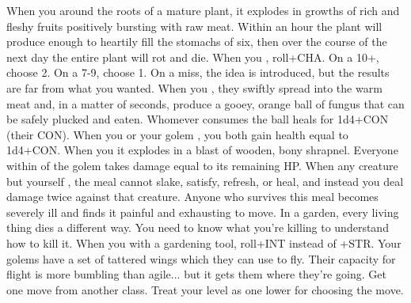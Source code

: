 \documentclass[darkmode]{dw_playbook}
\begin{document}
    {
            {When you  around the roots of a mature plant, it explodes in growths of rich and fleshy fruits positively bursting with raw meat.  Within an hour the plant will produce enough to heartily fill the stomachs of six, then over the course of the next day the entire plant will rot and die.}
        \gap
            {When you , roll+CHA.  On a 10+, choose 2.  On a 7-9, choose 1.  On a miss, the idea is introduced, but the results are far from what you wanted.
            \gapSm
            \gapSm
            \gapSm
            }
        \gap
            {When you , they swiftly spread into the warm meat and, in a matter of seconds, produce a gooey, orange ball of fungus that can be safely plucked and eaten.  Whomever consumes the ball heals for 1d4+CON (their CON).}
        \gap
            {When you or your golem , you both gain health equal to 1d4+CON.}
        \gap
            {When you  it explodes in a blast of wooden, bony shrapnel.  Everyone within  of the golem takes damage equal to its remaining HP.}
        \gap
            {When any creature but yourself , the meal cannot slake, satisfy, refresh, or heal, and instead you deal damage twice against that creature.  Anyone who survives this meal becomes severely ill and finds it painful and exhausting to move.}
        \gap
            {In a garden, every living thing dies a different way.  You need to know what you're killing to understand how to kill it.  When you  with a gardening tool, roll+INT instead of +STR.}
        \gap
            {Your golems have a set of tattered wings which they can use to fly.  Their capacity for flight is more bumbling than agile... but it gets them where they’re going.}
        \gap
            {Get one move from another class. Treat your level as one lower for choosing the move.}
    }
\end{document}

